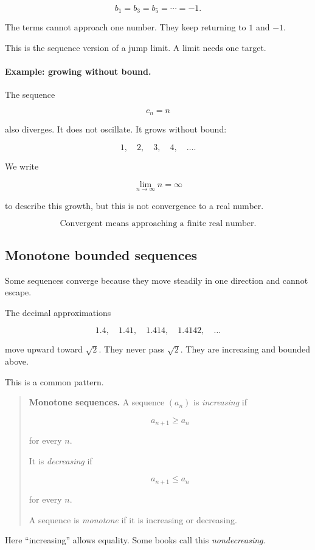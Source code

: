 \[
b_1=b_3=b_5=\cdots=-1.
\]

The terms cannot approach one number.  They keep returning to \(1\) and \(-1\).

This is the sequence version of a jump limit.  A limit needs one target.

\paragraph{Example: growing without bound.}
The sequence

\[
c_n=n
\]

also diverges.  It does not oscillate.  It grows without bound:

\[
1,\quad 2,\quad 3,\quad 4,\quad \ldots.
\]

We write

\[
\lim_{n\to\infty}n=\infty
\]

to describe this growth, but this is not convergence to a real number.

\[
\boxed{\text{Convergent means approaching a finite real number.}}
\]

\subsection{Monotone bounded sequences}
\label{subsec:monotone-bounded-sequences}

Some sequences converge because they move steadily in one direction and cannot escape.

The decimal approximations

\[
1.4,\quad 1.41,\quad 1.414,\quad 1.4142,\quad \ldots
\]

move upward toward \(\sqrt2\).  They never pass \(\sqrt2\).  They are increasing and bounded above.

This is a common pattern.

\begin{quote}
\textbf{Monotone sequences.}
A sequence \((a_n)\) is \emph{increasing} if

\[
a_{n+1}\ge a_n
\]

for every \(n\).

It is \emph{decreasing} if

\[
a_{n+1}\le a_n
\]

for every \(n\).

A sequence is \emph{monotone} if it is increasing or decreasing.
\end{quote}

Here ``increasing'' allows equality.  Some books call this \emph{nondecreasing}.

